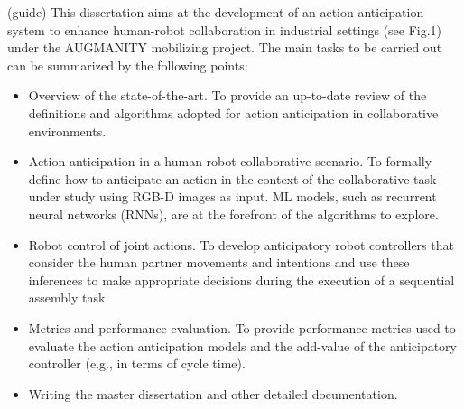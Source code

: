 {\color{red}
(guide) This dissertation aims at the development of an action anticipation system to enhance human-robot collaboration in industrial settings (see Fig.1) under the AUGMANITY mobilizing project. The main tasks to be carried out can be summarized by the following points:
\begin{itemize}
\item Overview of the state-of-the-art. To provide an up-to-date review of the definitions and algorithms adopted for action anticipation in collaborative environments.
\item Action anticipation in a human-robot collaborative scenario. To formally define how to anticipate an action in the context of the collaborative task under study using RGB-D images as input. ML models, such as recurrent neural networks (RNNs), are at the forefront of the algorithms to explore.
\item Robot control of joint actions. To develop anticipatory robot controllers that consider the human partner movements and intentions and use these inferences to make appropriate decisions during the execution of a sequential assembly task.
\item Metrics and performance evaluation. To provide performance metrics used to evaluate the action anticipation models and the add-value of the anticipatory controller (e.g., in terms of cycle time).
\item Writing the master dissertation and other detailed documentation.
\end{itemize}
}

